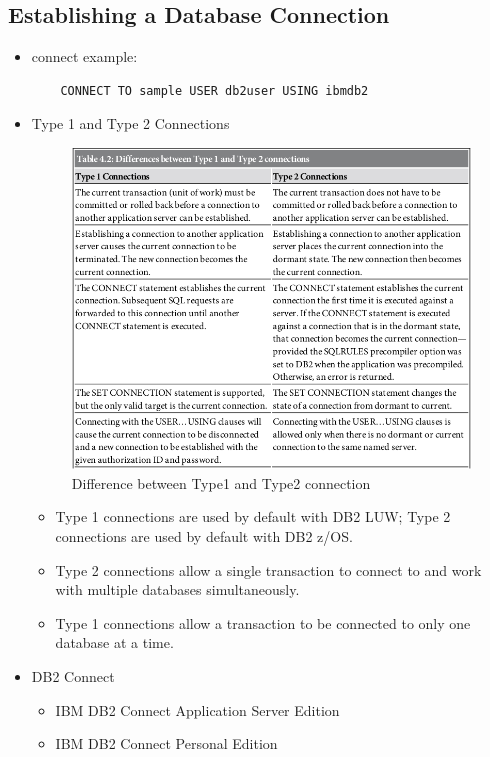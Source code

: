 \documentclass{article}
\begin{document}
\subsection{Establishing a Database Connection}
\begin{itemize}
\item connect example:
	\begin{verbatim}
	CONNECT TO sample USER db2user USING ibmdb2
	\end{verbatim}
\item Type 1 and Type 2 Connections
	\begin{figure}[H]
	\centering
	\includegraphics[scale=0.6]{type-connection.png}
	\caption{Difference between Type1 and Type2 connection}
	\end{figure}	
	\begin{itemize}
		\item Type 1 connections are used by default with DB2 LUW; Type 2 connections are used by default with DB2 z/OS.
		\item Type 2 connections allow a single transaction to connect to and work with multiple databases simultaneously.
		\item Type 1 connections allow a transaction to be connected to only one database at a time.
	\end{itemize}
\item DB2 Connect
	\begin{itemize}
	\item IBM DB2 Connect Application Server Edition
	\item IBM DB2 Connect Personal Edition

\end{itemize}
\end{itemize}
\end{document}
